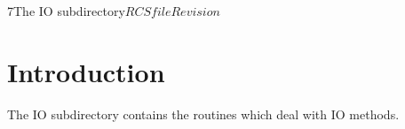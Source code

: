 %   

\begin{cactuspart}{7}{The IO subdirectory}{$RCSfile$}{$Revision$}
\renewcommand{\thepage}{\Alph{part}\arabic{page}}

\chapter{Introduction}

The IO subdirectory contains the routines which deal with IO methods.

\end{cactuspart}
